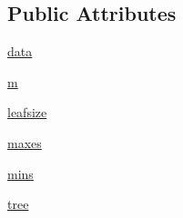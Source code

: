 \subsection*{Public Attributes}
\begin{DoxyCompactItemize}
\item 
\hyperlink{classscipy_1_1spatial_1_1kdtree_1_1KDTree_a89685062babd7ff12cd5f465f7e74a6c}{data}
\item 
\hyperlink{classscipy_1_1spatial_1_1kdtree_1_1KDTree_a79ba7c07dbc703fd689e82541f44b84c}{m}
\item 
\hyperlink{classscipy_1_1spatial_1_1kdtree_1_1KDTree_afc6f34f45726bb27be32908d8345de49}{leafsize}
\item 
\hyperlink{classscipy_1_1spatial_1_1kdtree_1_1KDTree_aa94c9b4f7ca63474d06e6bcbdd110c9a}{maxes}
\item 
\hyperlink{classscipy_1_1spatial_1_1kdtree_1_1KDTree_a87b8f3b2253d9f73512530535cf40fb4}{mins}
\item 
\hyperlink{classscipy_1_1spatial_1_1kdtree_1_1KDTree_a885b7950948f0cf39887d406ffe4d456}{tree}
\end{DoxyCompactItemize}


